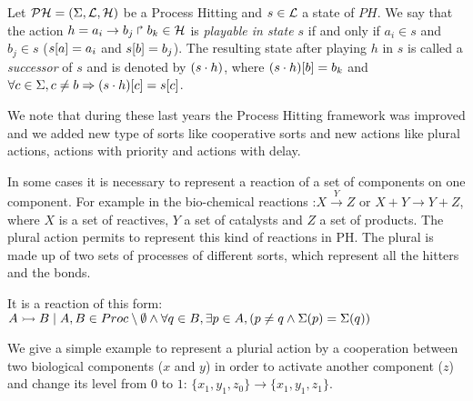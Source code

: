 \begin{definition} 
\label{def:playableAction}
Let $\mathcal{PH} = (\Sigma,\mathcal{L},\mathcal{H})$ be a Process Hitting and $s \in \mathcal{L}$ a state of $PH$.
We say that the action $h = a_i\rightarrow b_j\Rsh b_k \in \mathcal{H}$
is \emph{playable in state $s$} if and only if
$a_i \in s$ and $b_j \in s$ (\ie ${s[a]} = a_i$ and ${s[b]}=b_j$).
The resulting state after playing $h$ in $s$
is called a \emph{successor} of $s$ and
is denoted by $(s \cdot h)$,
where ${(s \cdot h)[b]} = b_k$ and
$\forall c \in \Sigma, c \neq b \Rightarrow {(s \cdot h)[c]}={s[c]}$.
\end{definition}

We note that during these last years the Process Hitting framework was improved and we added new type of sorts like cooperative sorts and new actions like plural actions, actions with priority and actions with delay.

In some cases it is necessary to represent a reaction of a set of components on one component. For example in the bio-chemical reactions :$X \xrightarrow{Y} Z$ or  $X + Y \rightarrow Y + Z$, where $ X $ is a set of reactives, $ Y $ a set of catalysts and $ Z $ a set of products.%
The plural action permits to represent this kind of reactions in PH. The plural is made up of two sets of processes of different sorts, which represent all the hitters and the bonds.

\begin{definition}
\label{def:pluralAction}
It is a reaction of this form: \\
 $ \mbox{$A \rightarrowtail B$} \mid A, B \in Proc \setminus \emptyset \wedge \forall q \in B, \exists p \in A, (p \neq q \wedge \Sigma(p) = \Sigma(q)) $
\end{definition}

\begin{example*}
We give a simple example to represent a plurial action by a cooperation between two biological components ($x$ and $y$) in order to activate another component ($z$) and change its level from $0$ to $1$: $\{x_1, y_1, z_0 \} \rightarrow \{x_1, y_1, z_1 \} $.

\begin{figure}[ht]
\label{fig:ph-plurial} 
\centering
{}

\end{figure}
\end{example*}

